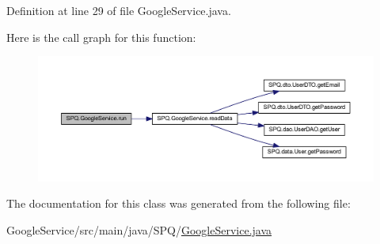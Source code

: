Definition at line 29 of file Google\+Service.\+java.

Here is the call graph for this function\+:\nopagebreak
\begin{figure}[H]
\begin{center}
\leavevmode
\includegraphics[width=350pt]{class_s_p_q_1_1_google_service_aecd41a7e761dc392fc96e096547dc504_cgraph}
\end{center}
\end{figure}


The documentation for this class was generated from the following file\+:\begin{DoxyCompactItemize}
\item 
Google\+Service/src/main/java/\+S\+P\+Q/\mbox{\hyperlink{_google_service_8java}{Google\+Service.\+java}}\end{DoxyCompactItemize}
